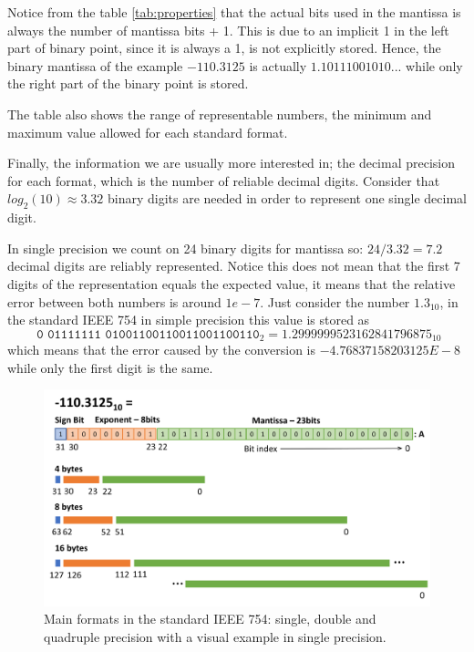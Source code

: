 Notice from the table \ref{tab:properties} that the actual bits used in the mantissa is always the number of mantissa bits + 1. 
This is due to an implicit 1 in the left part of binary point, since it is always a 1, is not explicitly stored. 
Hence, the binary mantissa of the example $-110.3125$ is actually $1.10111001010...$ while only the right part of the binary point is stored. 

The table also shows the range of representable numbers, the minimum and maximum value allowed for each standard format. 

Finally, the information we are usually more interested in; the decimal precision for each format, which is the number of reliable decimal digits. Consider that $log_2(10)\approx 3.32 $ binary digits are needed in order to represent one single decimal digit. 

In single precision we count on 24 binary digits for mantissa so: $24/3.32 = 7.2$ decimal digits are reliably represented. Notice this does not mean that the first 7 digits of the representation equals the expected value, it means that the relative error between both numbers is around $1e-7$. Just consider the number $1.3_{10}$, in the standard IEEE 754 in simple precision this value is stored as 
$$
\texttt{ 0 01111111 01001100110011001100110}_2 = 1.2999999523162841796875_{10}
$$
which means that the error caused by the conversion is $-4.76837158203125E-8$ while only the first digit is the same.

\newpage
\begin{figure}
    \centering
    \includegraphics[width= \textwidth]{./doc/Figures/ParametersIEEE.png}
    \caption{Main formats in the standard IEEE 754: single, double and quadruple precision with a visual example in single precision.}
    \label{fig:ParametersIEEE}
\end{figure}


